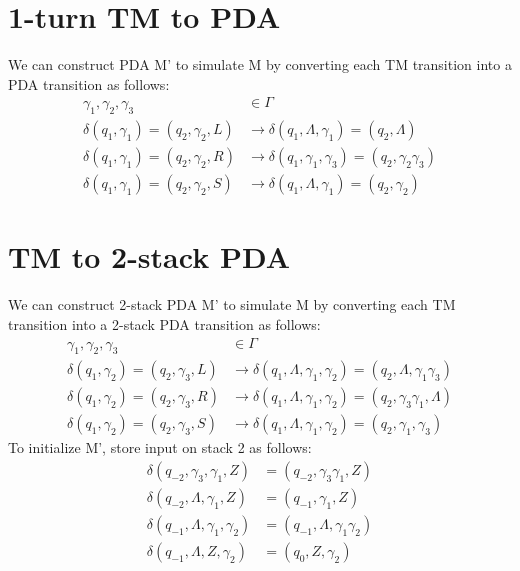 \documentclass{article}
\begin{document}
\section{1-turn TM to PDA}
We can construct PDA M' to simulate M by converting each TM transition into a
PDA transition as follows:
\begin{align*}
\gamma_1, \gamma_2, \gamma_3 &\in \Gamma\\
\delta(q_1, \gamma_1) = (q_2, \gamma_2, L) &\to
\delta(q_1, \Lambda, \gamma_1) = (q_2, \Lambda)\\
\delta(q_1, \gamma_1) = (q_2, \gamma_2, R) &\to
\delta(q_1, \gamma_1, \gamma_3) = (q_2, \gamma_2 \gamma_3)\\
\delta(q_1, \gamma_1) = (q_2, \gamma_2, S) &\to
\delta(q_1, \Lambda, \gamma_1) = (q_2, \gamma_2)
\end{align*}

\section{TM to 2-stack PDA}
We can construct 2-stack PDA M' to simulate M by converting each TM transition
into a 2-stack PDA transition as follows:
\begin{align*}
\gamma_1, \gamma_2, \gamma_3 &\in \Gamma\\
\delta(q_1, \gamma_2) = (q_2, \gamma_3, L) &\to
\delta(q_1, \Lambda, \gamma_1, \gamma_2) = (q_2, \Lambda, \gamma_1 \gamma_3)\\
\delta(q_1, \gamma_2) = (q_2, \gamma_3, R) &\to
\delta(q_1, \Lambda, \gamma_1, \gamma_2) = (q_2, \gamma_3 \gamma_1, \Lambda)\\
\delta(q_1, \gamma_2) = (q_2, \gamma_3, S) &\to
\delta(q_1, \Lambda, \gamma_1, \gamma_2) = (q_2, \gamma_1, \gamma_3)
\end{align*}
To initialize M', store input on stack 2 as follows:
\begin{align*}
\delta(q_{-2}, \gamma_3, \gamma_1, Z) &= (q_{-2}, \gamma_3 \gamma_1, Z)\\
\delta(q_{-2}, \Lambda, \gamma_1, Z) &= (q_{-1}, \gamma_1, Z)\\
\delta(q_{-1}, \Lambda, \gamma_1, \gamma_2) &= (q_{-1}, \Lambda, \gamma_1 \gamma_2)\\
\delta(q_{-1}, \Lambda, Z, \gamma_2) &= (q_0, Z, \gamma_2)
\end{align*}
\end{document}
